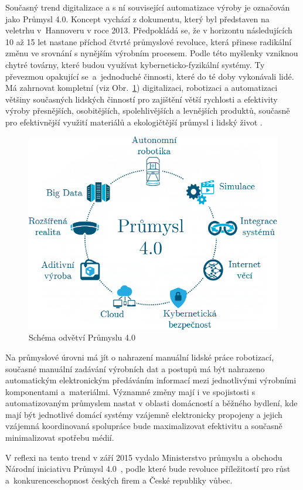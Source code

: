 Současný trend digitalizace a s ní související automatizace výroby je označován jako Průmysl 4.0. Koncept vychází z dokumentu, který byl představen na veletrhu v~Hannoveru v roce 2013. Předpokládá se, že v horizontu následujících 10 až 15 let nastane příchod čtvrté průmyslové revoluce, která přinese radikální změnu ve srovnání s nynějším výrobním procesem. Podle této myšlenky vzniknou chytré továrny, které budou využívat kyberneticko-fyzikální systémy. Ty převezmou opakující se~a~jednoduché činnosti, které do té doby vykonávali lidé. Má zahrnovat kompletní (viz Obr.~\ref{SchemaPrumysl4}) digitalizaci, robotizaci a automatizaci většiny současných lidských činností pro zajištění větší rychlosti a efektivity výroby přesnějších, osobitějších, spolehlivějších a levnějších produktů, současně pro efektivnější využití materiálů a ekologičtější průmysl i lidský život \cite{uvod_prumysl_4_pdf}.


	\begin{figure}[!ht]
  \begin{center}
   \includegraphics[scale=0.45]{obrazky/iot_industry4}
  \end{center}
	\vspace{-20pt}	
  \caption{Schéma odvětví Průmyslu 4.0}
	\label{SchemaPrumysl4}
\vspace{-10pt}	
\end{figure}



Na průmyslové úrovni má jít o nahrazení manuální lidské práce robotizací, současné manuální zadávání výrobních dat a postupů má být nahrazeno automatickým elektronickým předáváním informací mezi jednotlivými výrobními komponentami a~materiálmi. Významné změny mají i ve spojistosti s automatizovaným průmyslem nastat v oblasti domácností a běžného bydlení, kde mají být jednotlivé domácí systémy vzájemně elektronicky propojeny a jejich vzájemná koordinovaná spolupráce bude maximalizovat efektivitu a současně minimalizovat spotřebu médií.

V reflexi na tento trend v září 2015 vydalo Ministerstvo průmyslu a obchodu Národní iniciativu Průmysl 4.0~\cite{uvod_prumysl_4_pdf}, podle které bude revoluce příležitostí pro růst a~konkurenceschopnost českých firem a České republiky vůbec.










